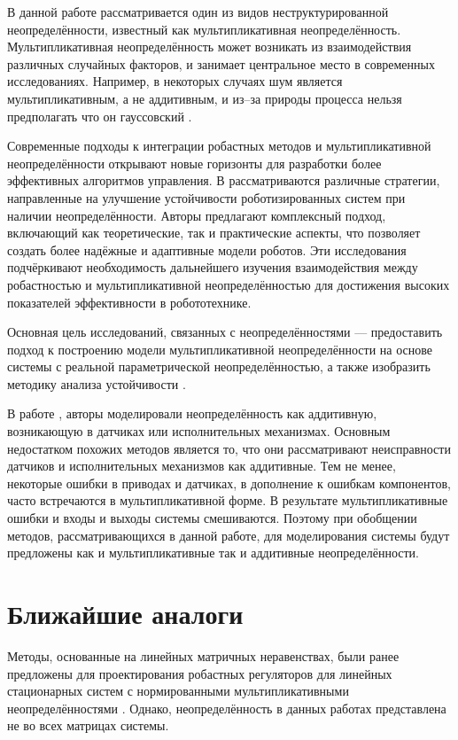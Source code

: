 В данной работе рассматривается один из видов неструктурированной неопределённости, известный как мультипликативная неопределённость. Мультипликативная неопределённость может возникать из взаимодействия различных случайных факторов, и занимает центральное место в современных исследованиях. Например, в некоторых случаях шум является мультипликативным, а не аддитивным, и из--за природы процесса нельзя предполагать что он гауссовский \cite{Bosse2016, Panza2015}.

Современные подходы к интеграции робастных методов и мультипликативной неопределённости открывают новые горизонты для разработки более эффективных алгоритмов управления. В \cite{Radek2017} рассматриваются различные стратегии, направленные на улучшение устойчивости роботизированных систем при наличии неопределённости. Авторы предлагают комплексный подход, включающий как теоретические, так и практические аспекты, что позволяет создать более надёжные и адаптивные модели роботов. Эти исследования подчёркивают необходимость дальнейшего изучения взаимодействия между робастностью и мультипликативной неопределённостью для достижения высоких показателей эффективности в робототехнике.

Основная цель исследований, связанных с неопределённостями --- предоставить подход к построению модели мультипликативной неопределённости на основе системы с реальной параметрической неопределённостью, а также изобразить методику анализа устойчивости \cite{Skogestad2005}.

В работе \cite{Mabrouk2023}, авторы моделировали неопределённость как аддитивную, возникающую в датчиках или исполнительных механизмах. Основным недостатком похожих методов является то, что они рассматривают неисправности датчиков и исполнительных механизмов как аддитивные. Тем не менее, некоторые ошибки в приводах и датчиках, в дополнение к ошибкам компонентов, часто встречаются в мультипликативной форме. В результате мультипликативные ошибки и входы и выходы системы смешиваются. Поэтому при обобщении методов, рассматривающихся в данной работе, для моделирования системы будут предложены как и мультипликативные так и аддитивные неопределённости.
 
\section{Ближайшие аналоги}\label{sec:ch1/sec6}

Методы, основанные на линейных матричных неравенствах, были ранее предложены для проектирования робастных регуляторов для линейных стационарных систем с нормированными мультипликативными неопределённостями \cite{POLYAK2021,ROTONDO2014}. Однако, неопределённость в данных работах представлена не во всех матрицах системы.

